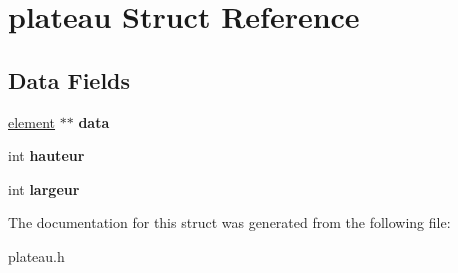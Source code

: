 \hypertarget{structplateau}{\section{plateau Struct Reference}
\label{structplateau}
}
\subsection*{Data Fields}
\begin{DoxyCompactItemize}
\item 
\hypertarget{structplateau_a551670e62478e25840b329270fcb9eb6}{\hyperlink{structelement}{element} $\ast$$\ast$ {\bfseries data}}\label{structplateau_a551670e62478e25840b329270fcb9eb6}

\item 
\hypertarget{structplateau_a5e94a2f98c16e8b6860f95c99da1c0d3}{int {\bfseries hauteur}}\label{structplateau_a5e94a2f98c16e8b6860f95c99da1c0d3}

\item 
\hypertarget{structplateau_a74f0f2591e5f65bf792b2c3c67817d78}{int {\bfseries largeur}}\label{structplateau_a74f0f2591e5f65bf792b2c3c67817d78}

\end{DoxyCompactItemize}


The documentation for this struct was generated from the following file\-:\begin{DoxyCompactItemize}
\item 
plateau.\-h\end{DoxyCompactItemize}
